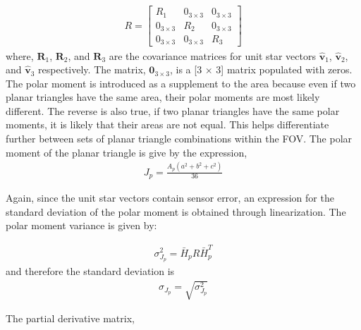 \documentclass[]{aiaa-tc}%
\begin{document}
\begin{align}
R = 
\begin{bmatrix}
 R_1 & 0_{3\times3} & 0_{3\times3}\\
 0_{3\times3} & R_2 & 0_{3\times3}\\
 0_{3\times3} & 0_{3\times3} & R_3
\end{bmatrix}
\end{align}
where, $\textbf{R}_1$,  $\textbf{R}_2$, and $\textbf{R}_3$ are the covariance matrices for unit star vectors $\hat{\textbf{v}}_1$, $\hat{\textbf{v}}_2$, and $\hat{\textbf{v}}_3$ respectively.
The matrix, $\textbf{0}_{3 \times 3}$, is a [3 $\times$ 3] matrix populated with zeros. The polar moment is introduced as
a supplement to the area because even if two planar triangles have the same area, their polar moments are most likely different. The reverse is also true, if two planar triangles have the same polar moments, it is likely that their areas are not equal. This helps differentiate further between sets of planar triangle combinations within the FOV. The polar moment of the planar triangle is give by the expression,
\begin{align}
J_p = \frac{A_p(a^2+b^2+c^2)}{36}
\end{align}

Again, since the unit star vectors contain sensor error, an expression for the standard deviation of the polar moment is obtained through linearization. The polar moment variance is given by:

\begin{align}
\sigma^2_{J_{p}} = \bar{H}_p R \bar{H}^T_p  \label{polar_covar}
\end{align}
and therefore the standard deviation is 
\begin{align}
\sigma_{J_{p}} = \sqrt{\sigma_{J_{p}}^2}\label{polar_STD} 
\end{align}

The partial derivative matrix, 
\end{document}
